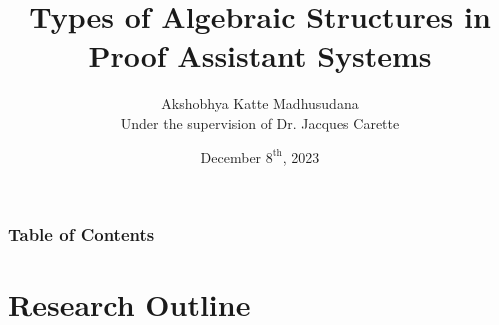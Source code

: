 \documentclass[xcolor={dvipsnames}]{beamer}
\title[Algebra in Proof Systems]{Types of Algebraic Structures in Proof Assistant Systems}
\author[Akshobhya K M]{Akshobhya Katte Madhusudana\\\small{}Under the supervision of Dr. Jacques Carette}
\institute[McMaster University]{McMaster University}
\date{December $8^{\text{th}}$, 2023}
\begin{document}
\frame{\titlepage}


\begin{frame}
\frametitle{Table of Contents}
\tableofcontents
\end{frame}
 
\begin{comment}
\section{Definition}

\begin{frame}
  \frametitle{Definition}

  \begin{itemize}

    \item A \textit{signature} is a pair $\Sigma = (S,F)$ such that $S$ is a
    carrier set and $F$ is a collection of operation names.

    \item A \emph{$\Sigma$-algebra} $A$ is defined as pair $A = (A,F_A)$, a
    mathematical structure consisting of a carrier set $(A)$ and a family of
    functions $(F_A)$ defined for each function symbol in the signature.

    \item The type (or language) of the algebra is a set of function symbols.
    Each member of this set is assigned a positive number which is the arity of
    the member.
  \end{itemize}
\end{frame}
\end{comment}
\section{Research Outline}
\end{document}
